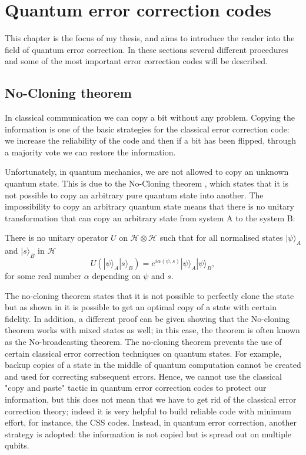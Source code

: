 \chapter{Quantum error correction codes}
This chapter is the focus of my thesis, and aims to introduce the reader into the field of quantum error correction. 
In these sections several different procedures and some of the most important error correction codes will be described.  


\section{No-Cloning theorem}
In classical communication we can copy a bit without any problem. Copying the information is one of the basic strategies for the classical error correction code: we increase the reliability of the code and then if a bit has been flipped, through a majority vote we can restore the information.  

Unfortunately, in quantum mechanics, we are not allowed to copy an unknown quantum state. This is due to the No-Cloning theorem \cite{cloning}, which states that it is not possible to copy an arbitrary pure quantum state into another.
The impossibility to copy an arbitrary quantum state means that there is no unitary transformation that can copy an arbitrary state from system A to the system B:
\begin{theorem}
There is no unitary operator $U$ on $\mathcal{H} \otimes \mathcal{H}$ such that for all normalised states $|\psi\rangle_{A}$ and $|s\rangle_{B}$ in $\mathcal{H}$
$$
U\left(|\psi\rangle_{A}|s\rangle_{B}\right)=e^{i \alpha(\psi, s)}|\psi\rangle_{A}|\psi\rangle_{B},
$$
for some real number $\alpha$ depending on $\psi$ and $s$.
\end{theorem}



The no-cloning theorem states that it is not possible to perfectly clone the state but as shown in \cite{buzek1998universal} it is possible to get an optimal copy of a state with certain fidelity. In addition, a different proof can be given showing that the No-cloning theorem works with mixed states as well; in this case, the theorem is often known as the No-broadcasting theorem.
The no-cloning theorem prevents the use of certain classical error correction techniques on quantum states. For example, backup copies of a state in the middle of quantum computation cannot be created and used for correcting subsequent errors.
Hence, we cannot use the classical "copy and paste" tactic in quantum error correction codes to protect our information, but this does not mean that we have to get rid of the classical error correction theory; indeed it is very helpful to build reliable code with minimum effort, for instance, the CSS codes.
Instead, in quantum error correction, another strategy is adopted: the information is not copied but is spread out on multiple qubits. 



